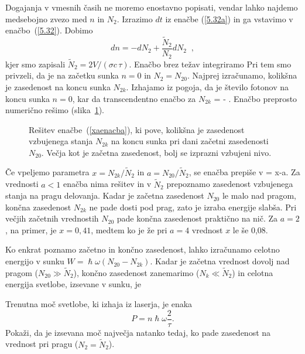 Dogajanja v vmesnih časih ne moremo enostavno popisati, vendar lahko najdemo
medsebojno zvezo med $n$ in $N_2$. 
Izrazimo $dt$ iz enačbe (\ref{5.32a}) in ga vstavimo v enačbo~(\ref{5.32}).
Dobimo
\begin{equation}
dn=-dN_{2}+\frac{\tilde{N}_2}{N_{2}}dN_{2}\;\;,  \label{5.341}
\end{equation}
kjer smo zapisali $\tilde{N}_{2}=2V/(\sigma c\,\tau)$.
Enačbo brez težav integriramo
Pri tem smo privzeli, da je na začetku sunka $n=0$ in $N_{2}=N_{20}$. 
Najprej izračunamo, kolikšna je zasedenost na koncu sunka 
$N_{2k}$. Izhajamo iz pogoja, da je število fotonov na koncu sunka $n=0$, 
kar da transcendentno enačbo za $N_{2k}$
\beq
\ln {} = - .
\label{xaenacba}
\eeq
Enačbo preprosto numerično rešimo (slika~\ref{fig:Qeq}).

\begin{figure}[h]
\centering
\def\svgwidth{90truemm} 

\caption{Rešitev enačbe~(\ref{xaenacba}), ki pove, kolikšna je
zasedenost vzbujenega stanja $N_{2k}$ na koncu sunka pri dani začetni 
zasedenosti $N_{20}$. Večja kot je začetna zasedenost, bolj se 
izprazni vzbujeni nivo.
}
\label{fig:Qeq}
\end{figure}

Če vpeljemo parametra $x=N_{2k}/\tilde{N}_2$ in $a=N_{20}/\tilde{N}_{2}$, se
enačba prepiše v 
\beq
\ln {}= x-a.
\eeq
Za vrednosti $a<1$ enačba nima rešitev in 
v $\tilde{N}_{2}$ prepoznamo zasedenost vzbujenega stanja na pragu delovanja. Kadar je začetna 
zasedenost $N_{20}$ le malo nad pragom, končna zasedenost $N_{2k}$ ne pade 
dosti pod prag, zato je izraba energije slabša. Pri večjih začetnih vrednostih 
$N_{20}$ pade končna zasedenost praktično na nič. Za $a=2$, na primer,
je $x=0,41$, medtem ko je že pri $a=4$ vrednost $x$ le še 0,08. 

Ko enkrat poznamo začetno in končno zasedenost, lahko izračunamo 
celotno energijo v sunku $W=\hslash \omega (N_{20}-N_{2k})$. Kadar je začetna vrednost
dovolj nad pragom ($N_{20}\gg\tilde{N}_{2}$), končno zasedenost zanemarimo ($N_{k}\ll\tilde{N}_{2}$) in 
celotna energija svetlobe, izsevane v sunku, je 
\begin{naloga}
\label{nalpmax}
Trenutna moč svetlobe, ki izhaja iz laserja, je enaka 
\begin{equation}
P=n \hslash \omega \frac{2}{\tau}.
\end{equation}
Pokaži, da je izsevana moč največja natanko tedaj, ko pade zasedenost na vrednost pri 
pragu ($N_{2}=\tilde{N}_{2}$). 
\end{naloga}


